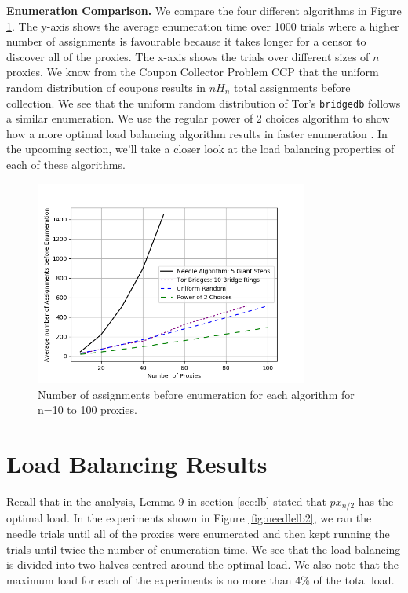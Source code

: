 \textbf{Enumeration Comparison.} We compare the four different algorithms in Figure \ref{fig:comparison}. The y-axis shows the average enumeration time over 1000 trials where a higher number of assignments is favourable because it takes longer for a censor to discover all of the proxies. The x-axis shows the trials over different sizes of $n$ proxies. We know from the Coupon Collector Problem \ac{CCP} that the uniform random distribution of coupons results in $nH_n$ total assignments before collection. We see that the uniform random distribution of Tor's \texttt{bridgedb} follows a similar enumeration. We use the regular power of 2 choices algorithm to show how a more optimal load balancing algorithm results in faster enumeration \cite{xu2011generalized}. In the upcoming section, we'll take a closer look at the load balancing properties of each of these algorithms.

\begin{figure}[h!]
\centering
     \includegraphics[width=0.8\textwidth]{fig/comparison_graph.png}
    \caption{Number of assignments before enumeration for each algorithm for n=10 to 100 proxies.}

    \label{fig:comparison}
\end{figure}

\section{Load Balancing Results}

Recall that in the analysis, Lemma $9$ in section \ref{sec:lb} stated that $px_{n/2}$ has the optimal load. In the experiments shown in Figure \ref{fig:needlelb2}, we ran the needle trials until all of the proxies were enumerated and then kept running the trials until twice the number of enumeration time. We see that the load balancing is divided into two halves centred around the optimal load. We also note that the maximum load for each of the experiments is no more than 4\% of the total load.

